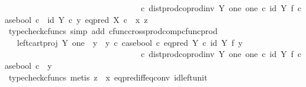 \begin{isabellebody}
\ \ \ \ \ \ \ \ \ \ \ \ \ \ \ \ \ \ \ \ \ \ \ \ \ \ \ \ \ \ \ \ \ {\isasymcirc}\isactrlsub c\ dist{\isacharunderscore}{\kern0pt}prod{\isacharunderscore}{\kern0pt}coprod{\isacharunderscore}{\kern0pt}inv\ Y\ one\ one\ {\isasymcirc}\isactrlsub c\ {\isacharparenleft}{\kern0pt}id\ Y\ {\isasymtimes}\isactrlsub f\ case{\isacharunderscore}{\kern0pt}bool{\isacharparenright}{\kern0pt}\ {\isasymcirc}\isactrlsub c\ \ {\isasymlangle}id\ Y\ {\isasymcirc}\isactrlsub c\ y{}{\isacharcomma}{\kern0pt}\ eq{\isacharunderscore}{\kern0pt}pred\ X\ {\isasymcirc}\isactrlsub c\ \ {\isasymlangle}x{\isacharcomma}{\kern0pt}\ z{\isasymrangle}{\isasymrangle}{\isachardoublequoteclose}\isanewline
\ \ \ \ \ \ \ \ \ \ \ \ \isamarkupfalse%
\ {\isacharparenleft}{\kern0pt}typecheck{\isacharunderscore}{\kern0pt}cfuncs{\isacharcomma}{\kern0pt}\ simp\ add{\isacharcolon}{\kern0pt}\ cfunc{\isacharunderscore}{\kern0pt}cross{\isacharunderscore}{\kern0pt}prod{\isacharunderscore}{\kern0pt}comp{\isacharunderscore}{\kern0pt}cfunc{\isacharunderscore}{\kern0pt}prod{\isacharparenright}{\kern0pt}\isanewline
\ \ \ \ \ \ \ \ \ \ \isamarkupfalse%
\ \isamarkupfalse%
\ {\isachardoublequoteopen}{\isachardot}{\kern0pt}{\isachardot}{\kern0pt}{\isachardot}{\kern0pt}\ {\isacharequal}{\kern0pt}\ {\isacharparenleft}{\kern0pt}left{\isacharunderscore}{\kern0pt}cart{\isacharunderscore}{\kern0pt}proj\ Y\ one\ {\isasymamalg}\ {\isacharparenleft}{\kern0pt}{\isacharparenleft}{\kern0pt}y{}\ {\isasymamalg}\ y{}{\isacharparenright}{\kern0pt}\ {\isasymcirc}\isactrlsub c\ case{\isacharunderscore}{\kern0pt}bool\ {\isasymcirc}\isactrlsub c\ eq{\isacharunderscore}{\kern0pt}pred\ Y\ {\isasymcirc}\isactrlsub c\ {\isacharparenleft}{\kern0pt}id\ Y\ {\isasymtimes}\isactrlsub f\ y{}{\isacharparenright}{\kern0pt}{\isacharparenright}{\kern0pt}{\isacharparenright}{\kern0pt}\ \isanewline
\ \ \ \ \ \ \ \ \ \ \ \ \ \ \ \ \ \ \ \ \ \ \ \ \ \ \ \ \ \ \ \ \ {\isasymcirc}\isactrlsub c\ dist{\isacharunderscore}{\kern0pt}prod{\isacharunderscore}{\kern0pt}coprod{\isacharunderscore}{\kern0pt}inv\ Y\ one\ one\ {\isasymcirc}\isactrlsub c\ {\isacharparenleft}{\kern0pt}id\ Y\ {\isasymtimes}\isactrlsub f\ case{\isacharunderscore}{\kern0pt}bool{\isacharparenright}{\kern0pt}\ {\isasymcirc}\isactrlsub c\ \ {\isasymlangle}y{}{\isacharcomma}{\kern0pt}\ {\isasymf}{\isasymrangle}{\isachardoublequoteclose}\isanewline
\ \ \ \ \ \ \ \ \ \ \ \ \isamarkupfalse%
\ {\isacharparenleft}{\kern0pt}typecheck{\isacharunderscore}{\kern0pt}cfuncs{\isacharcomma}{\kern0pt}\ metis\ {\isacartoucheopen}z\ {\isasymnoteq}\ x{\isacartoucheclose}\ eq{\isacharunderscore}{\kern0pt}pred{\isacharunderscore}{\kern0pt}iff{\isacharunderscore}{\kern0pt}eq{\isacharunderscore}{\kern0pt}conv\ id{\isacharunderscore}{\kern0pt}left{\isacharunderscore}{\kern0pt}unit{}{\isacharparenright}{\kern0pt}\isanewline

\end{isabellebody}
